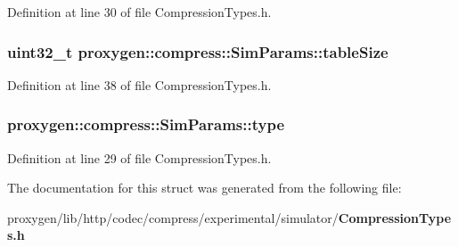 Definition at line 30 of file Compression\+Types.\+h.

\subsubsection[{table\+Size}]{\setlength{\rightskip}{0pt plus 5cm}uint32\+\_\+t proxygen\+::compress\+::\+Sim\+Params\+::table\+Size}\label{structproxygen_1_1compress_1_1SimParams_a6b9b7dfedc868076f81acac8b56e643a}


Definition at line 38 of file Compression\+Types.\+h.

\subsubsection[{type}]{ proxygen\+::compress\+::\+Sim\+Params\+::type}\label{structproxygen_1_1compress_1_1SimParams_a9a24d6755cb25f8530ab3c44d8acea2a}


Definition at line 29 of file Compression\+Types.\+h.



The documentation for this struct was generated from the following file\+:\begin{DoxyCompactItemize}
\item 
proxygen/lib/http/codec/compress/experimental/simulator/{\bf Compression\+Types.\+h}\end{DoxyCompactItemize}
